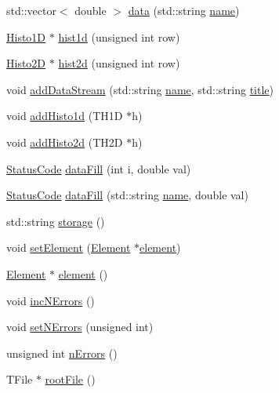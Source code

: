 \begin{DoxyCompactItemize}
\item 
std\+::vector$<$ double $>$ \hyperlink{classProcessus_abf4d91fb36707e1d50178bab12d21ae9}{data} (std\+::string \hyperlink{classObject_a300f4c05dd468c7bb8b3c968868443c1}{name})
\item 
\hyperlink{classHisto1D}{Histo1D} $\ast$ \hyperlink{classProcessus_a409227db936baff03c0462c1bcfe8069}{hist1d} (unsigned int row)
\item 
\hyperlink{classHisto2D}{Histo2D} $\ast$ \hyperlink{classProcessus_a73b5118cb5f2b5eaad33286183b86cfc}{hist2d} (unsigned int row)
\item 
void \hyperlink{classProcessus_a308c8f193802f1d1ab49d4447d0cb281}{add\+Data\+Stream} (std\+::string \hyperlink{classObject_a300f4c05dd468c7bb8b3c968868443c1}{name}, std\+::string \hyperlink{classObject_a73a0f1a41828fdd8303dd662446fb6c3}{title})
\item 
void \hyperlink{classProcessus_ad46e0d4dfdfdcbce001ee6be1746dfa4}{add\+Histo1d} (T\+H1D $\ast$h)
\item 
void \hyperlink{classProcessus_ac1ed1aed5edaeabdf18aa56775440471}{add\+Histo2d} (T\+H2D $\ast$h)
\item 
\hyperlink{classStatusCode}{Status\+Code} \hyperlink{classProcessus_a0d093b48f3218a088ba030e24372f18c}{data\+Fill} (int i, double val)
\item 
\hyperlink{classStatusCode}{Status\+Code} \hyperlink{classProcessus_aa31ab71711f7af6a729441ff573f69c9}{data\+Fill} (std\+::string \hyperlink{classObject_a300f4c05dd468c7bb8b3c968868443c1}{name}, double val)
\item 
std\+::string \hyperlink{classProcessus_a33fa1a0b54a636e5cdd680669fd9ea51}{storage} ()
\item 
void \hyperlink{classProcessus_a8ddef94227d83d9dae2cd49aebc33353}{set\+Element} (\hyperlink{classElement}{Element} $\ast$\hyperlink{classProcessus_a6fe155527431a7190b7d44d600b9608d}{element})
\item 
\hyperlink{classElement}{Element} $\ast$ \hyperlink{classProcessus_a6fe155527431a7190b7d44d600b9608d}{element} ()
\item 
void \hyperlink{classProcessus_abe603d0636f76db6aa6c5c60cf34c591}{inc\+N\+Errors} ()
\item 
void \hyperlink{classProcessus_a831b027b9cf18ab56fa6147b5d3055da}{set\+N\+Errors} (unsigned int)
\item 
unsigned int \hyperlink{classProcessus_a82a0487f82f07cc2c2dc2731f98149e7}{n\+Errors} ()
\item 
T\+File $\ast$ \hyperlink{classProcessus_a247e8c362ec08422cf53d08dd23b093c}{root\+File} ()

\end{DoxyCompactItemize}
